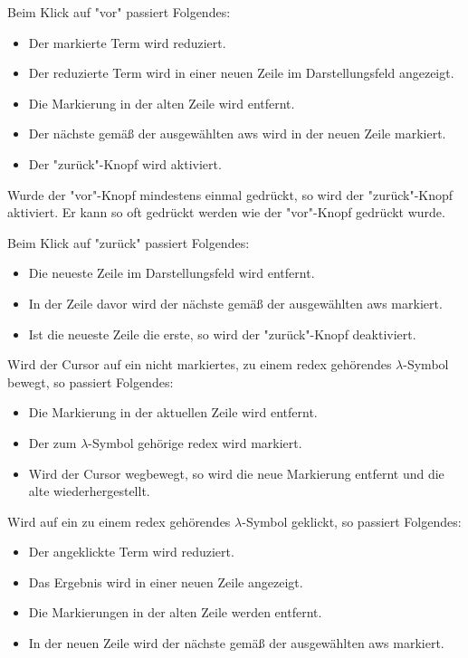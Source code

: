\documentclass[parskip=full,11pt,twoside]{scrartcl}
\begin{document}
Beim Klick auf "vor" passiert Folgendes:
\begin{itemize}
\item Der markierte Term wird reduziert.
\item Der reduzierte Term wird in einer neuen Zeile im Darstellungsfeld angezeigt.
\item Die Markierung in der alten Zeile wird entfernt.
\item Der nächste  gemäß der ausgewählten \gls{aws} wird in der neuen Zeile markiert.
\item Der "zurück"-Knopf wird aktiviert.
\end{itemize}

Wurde der "vor"-Knopf mindestens einmal gedrückt, so wird der "zurück"-Knopf aktiviert.
Er kann so oft gedrückt werden wie der "vor"-Knopf gedrückt wurde.

Beim Klick auf "zurück" passiert Folgendes:
\begin{itemize}
\item Die neueste Zeile im Darstellungsfeld wird entfernt.
\item In der Zeile davor wird der nächste  gemäß der ausgewählten \gls{aws} markiert.
\item Ist die neueste Zeile die erste, so wird der "zurück"-Knopf deaktiviert.
\end{itemize}

Wird der Cursor auf ein nicht markiertes, zu einem \gls{redex} gehörendes $\lambda$-Symbol bewegt, so passiert Folgendes:
\begin{itemize}
\item Die Markierung in der aktuellen Zeile wird entfernt.
\item Der zum $\lambda$-Symbol gehörige \gls{redex} wird markiert.
\item Wird der Cursor wegbewegt, so wird die neue Markierung entfernt und die alte wiederhergestellt.
\end{itemize}

Wird auf ein zu einem \gls{redex} gehörendes $\lambda$-Symbol geklickt, so passiert Folgendes:
\begin{itemize}
\item Der angeklickte Term wird reduziert.
\item Das Ergebnis wird in einer neuen Zeile angezeigt.
\item Die Markierungen in der alten Zeile werden entfernt.
\item In der neuen Zeile wird der nächste  gemäß der ausgewählten \gls{aws} markiert.
\end{itemize}
\end{document}
